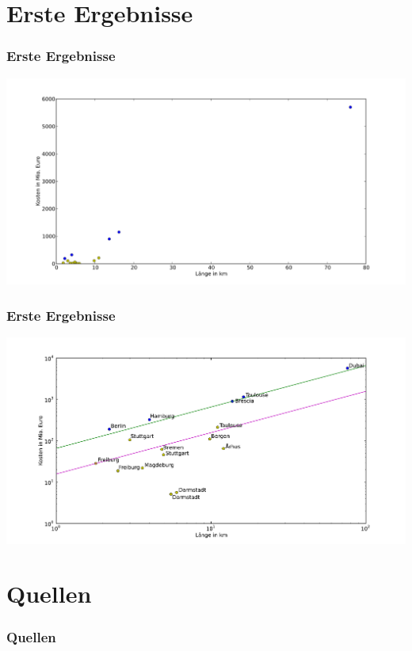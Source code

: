 \documentclass[xcolor=dvipsnames]{beamer}
\begin{document}

\section{Erste Ergebnisse}
\begin{frame}
  \frametitle{Erste Ergebnisse}
  \includegraphics[width=\textwidth]{plot/overview.pdf}
\end{frame}


\begin{frame}
  \frametitle{Erste Ergebnisse}
  \includegraphics[width=\textwidth]{plot/detail.pdf}
\end{frame}


\section{Quellen}
\begin{frame}[allowframebreaks]
  \frametitle{Quellen}

  \nocite{UmrechnungGoldmark}
  \nocite{buernheim1997bahnen}
  \nocite{hoeltge1992hessen}
  \nocite{BybaneBergen}
  \nocite{BergenCurrentStatus}
  \nocite{midttrafik}
  \nocite{UmrechnungKronen}
  \nocite{osm}
  \nocite{ba3reform}
  \nocite{ReformEroeffnung}
  \nocite{hallodubai}
  \nocite{gulfnews2009costs}

  \begin{scriptsize}
    
  \end{scriptsize}
\end{frame}

\end{document}
